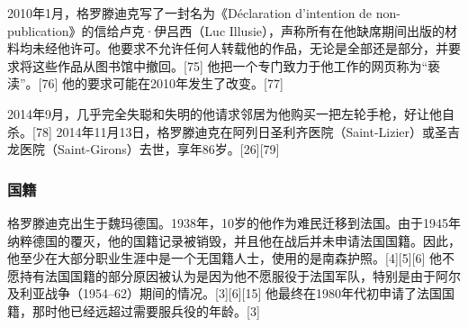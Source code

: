 2010年1月，格罗滕迪克写了一封名为《Déclaration d'intention de non-publication》的信给卢克·伊吕西（Luc Illusie），声称所有在他缺席期间出版的材料均未经他许可。他要求不允许任何人转载他的作品，无论是全部还是部分，并要求将这些作品从图书馆中撤回。[75] 他把一个专门致力于他工作的网页称为“亵渎”。[76] 他的要求可能在2010年发生了改变。[77]

2014年9月，几乎完全失聪和失明的他请求邻居为他购买一把左轮手枪，好让他自杀。[78] 2014年11月13日，格罗滕迪克在阿列日圣利齐医院（Saint-Lizier）或圣吉龙医院（Saint-Girons）去世，享年86岁。[26][79]
\subsubsection{国籍}
格罗滕迪克出生于魏玛德国。1938年，10岁的他作为难民迁移到法国。由于1945年纳粹德国的覆灭，他的国籍记录被销毁，并且他在战后并未申请法国国籍。因此，他至少在大部分职业生涯中是一个无国籍人士，使用的是南森护照。[4][5][6] 他不愿持有法国国籍的部分原因被认为是因为他不愿服役于法国军队，特别是由于阿尔及利亚战争（1954–62）期间的情况。[3][6][15] 他最终在1980年代初申请了法国国籍，那时他已经远超过需要服兵役的年龄。[3]